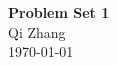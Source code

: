 \documentclass[12pt]{article}
\begin{document}
\begin{center}
    {\textbf {\huge Problem Set 1}}\\[5mm]
    {\large Qi Zhang} \\[5mm]
    \today\\[5mm]
\end{center}





\end{document}
